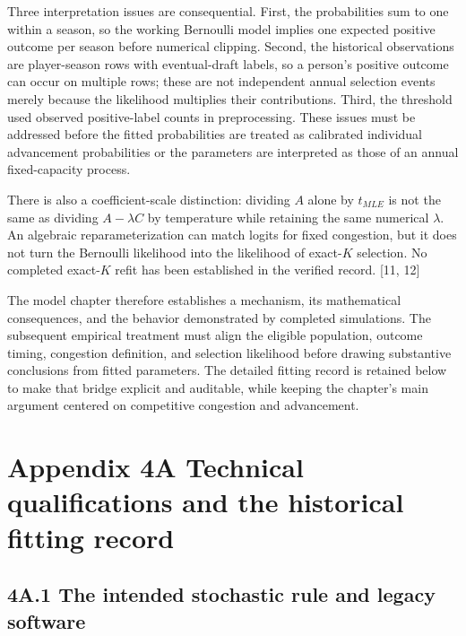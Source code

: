 Three interpretation issues are consequential. First, the probabilities sum to one within a season, so the working Bernoulli model implies one expected positive outcome per season before numerical clipping. Second, the historical observations are player-season rows with eventual-draft labels, so a person's positive outcome can occur on multiple rows; these are not independent annual selection events merely because the likelihood multiplies their contributions. Third, the threshold used observed positive-label counts in preprocessing. These issues must be addressed before the fitted probabilities are treated as calibrated individual advancement probabilities or the parameters are interpreted as those of an annual fixed-capacity process.

There is also a coefficient-scale distinction: dividing \(A\) alone by \(t_{MLE}\) is not the same as dividing \(A - \lambda C\) by temperature while retaining the same numerical \(\lambda\). An algebraic reparameterization can match logits for fixed congestion, but it does not turn the Bernoulli likelihood into the likelihood of exact-\(K\) selection. No completed exact-\(K\) refit has been established in the verified record. {[}11, 12{]}

The model chapter therefore establishes a mechanism, its mathematical consequences, and the behavior demonstrated by completed simulations. The subsequent empirical treatment must align the eligible population, outcome timing, congestion definition, and selection likelihood before drawing substantive conclusions from fitted parameters. The detailed fitting record is retained below to make that bridge explicit and auditable, while keeping the chapter's main argument centered on competitive congestion and advancement.

\clearpage
\section*{Appendix 4A Technical qualifications and the historical fitting record}\label{appendix-4a-technical-qualifications-and-the-historical-fitting-record}

\subsection*{4A.1 The intended stochastic rule and legacy software}\label{a.1-the-intended-stochastic-rule-and-legacy-software}


